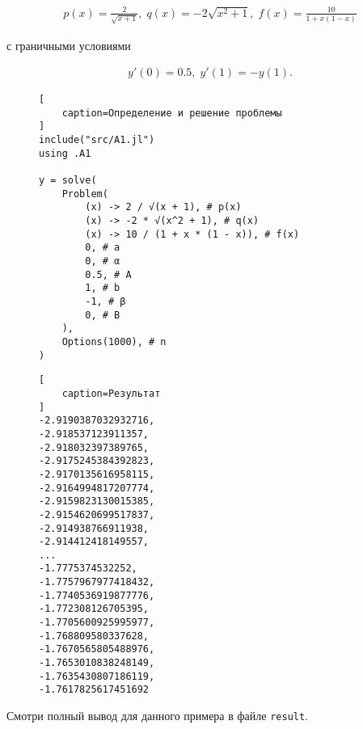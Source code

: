 \documentclass{article}
\newcommand{\sd}[0]{\iter\hypertarget{skip:\thesecounter.\theeqcounter}{\vspace{-10pt}}}
\newcommand{\hep}[1]{\vspace{#1pt}\hypertarget{eq:\thesecounter.\theeqcounter}{}\vspace{-#1pt}}
\newcommand{\hs}[0]{\sd\hep{18}}
\numberwithin{equation}{section}
\newcounter{secounter}[section]
\newcounter{eqcounter}
\newcommand{\iter}[0]{\stepcounter{eqcounter}}
\begin{document}
\hs
\begin{gather}
    p(x) = \frac{2}{\sqrt{x+1}}, \;
    q(x) = -2 \sqrt{x^2 + 1}, \;
    f(x) = \frac{10}{1 + x (1-x)}
\end{gather}

с граничными условиями

\hs
\begin{gather}
y'(0) = 0.5, \; y'(1) = -y(1).
\end{gather}

\begin{figure}[H]
\begin{lstlisting}[
    caption=Определение и решение проблемы
]
include("src/A1.jl")
using .A1

y = solve(
    Problem(
        (x) -> 2 / √(x + 1), # p(x)
        (x) -> -2 * √(x^2 + 1), # q(x)
        (x) -> 10 / (1 + x * (1 - x)), # f(x)
        0, # a
        0, # α
        0.5, # A
        1, # b
        -1, # β
        0, # B
    ),
    Options(1000), # n
)
\end{lstlisting}
\end{figure}

\begin{figure}[H]
\begin{lstlisting}[
    caption=Результат
]
-2.9190387032932716,
-2.918537123911357,
-2.918032397389765,
-2.9175245384392823,
-2.9170135616958115,
-2.9164994817207774,
-2.9159823130015385,
-2.9154620699517837,
-2.914938766911938,
-2.914412418149557,
...
-1.7775374532252,
-1.7757967977418432,
-1.7740536919877776,
-1.772308126705395,
-1.7705600925995977,
-1.768809580337628,
-1.7670565805488976,
-1.7653010838248149,
-1.7635430807186119,
-1.7617825617451692
\end{lstlisting}
\end{figure}

Смотри полный вывод для данного примера в файле \texttt{result}.
\end{document}

